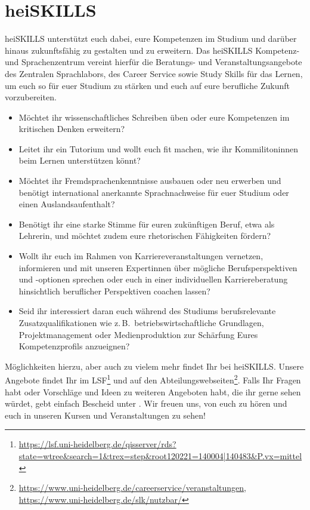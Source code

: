 \section{heiSKILLS}

heiSKILLS unterstützt euch dabei, eure Kompetenzen im Studium und darüber hinaus zukunftsfähig zu gestalten und zu erweitern. Das heiSKILLS Kompetenz- und Sprachenzentrum vereint hierfür die Beratungs- und Veranstaltungsangebote des Zentralen Sprachlabors, des Career Service sowie Study Skills für das Lernen, um euch so für euer Studium zu stärken und euch auf eure berufliche Zukunft vorzubereiten.

\begin{itemize}
  \item Möchtet ihr wissenschaftliches Schreiben üben oder eure Kompetenzen im kritischen Denken erweitern?
  \item Leitet ihr ein Tutorium und wollt euch fit machen, wie ihr Kommilitoninnen beim Lernen unterstützen könnt?
  \item Möchtet ihr Fremdsprachenkenntnisse ausbauen oder neu erwerben und benötigt international anerkannte Sprachnachweise für euer Studium oder einen Auslandsaufenthalt?
  \item Benötigt ihr eine starke Stimme für euren zukünftigen Beruf, etwa als Lehrerin, und möchtet zudem eure rhetorischen Fähigkeiten fördern?
  \item Wollt ihr euch im Rahmen von Karriereveranstaltungen vernetzen, informieren und mit unseren Expertinnen über mögliche Berufsperspektiven und -optionen sprechen oder euch in einer individuellen Karriereberatung hinsichtlich beruflicher Perspektiven coachen lassen?
  \item Seid ihr interessiert daran euch während des Studiums berufsrelevante Zusatzqualifikationen wie z.\,B.\, betriebswirtschaftliche Grundlagen, Projektmanagement oder Medienproduktion zur Schärfung Eures Kompetenzprofils anzueignen?

\end{itemize}

Möglichkeiten hierzu, aber auch zu vielem mehr findet Ihr bei heiSKILLS.
Unsere Angebote findet Ihr im LSF\footnote{\url{https://lsf.uni-heidelberg.de/qisserver/rds?state=wtree&search=1&trex=step&root120221=140004|140483&P.vx=mittel}} und auf den Abteilungswebseiten\footnote{\url{https://www.uni-heidelberg.de/careerservice/veranstaltungen}, \url{https://www.uni-heidelberg.de/slk/nutzbar/}}.
Falls Ihr Fragen habt oder Vorschläge und Ideen zu weiteren Angeboten habt, die ihr gerne sehen würdet, gebt einfach Bescheid unter . Wir freuen uns, von euch zu hören und euch in unseren Kursen und Veranstaltungen zu sehen!

